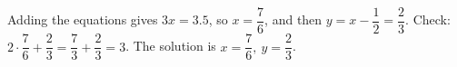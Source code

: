 Adding the equations gives $3x=3.5$, so $x=\dfrac{7}{6}$, and then $y=x-\dfrac{1}{2}=\dfrac{2}{3}$. Check: $2\cdot\dfrac{7}{6}+\dfrac{2}{3}=\dfrac{7}{3}+\dfrac{2}{3}=3$. The solution is $\boxed{x=\dfrac{7}{6},\ y=\dfrac{2}{3}}$.
